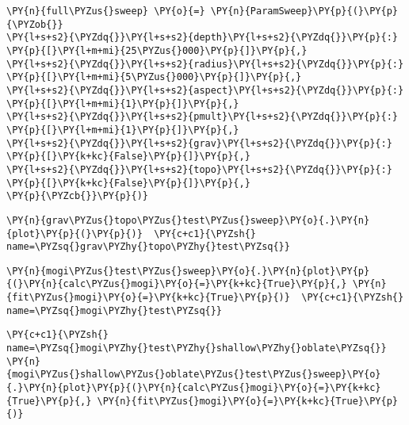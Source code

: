 \begin{tcolorbox}[breakable, size=fbox, boxrule=1pt, pad at break*=1mm,colback=cellbackground, colframe=cellborder]
\begin{Verbatim}[commandchars=\\\{\}]
\PY{n}{full\PYZus{}sweep} \PY{o}{=} \PY{n}{ParamSweep}\PY{p}{(}\PY{p}{\PYZob{}}
\PY{l+s+s2}{\PYZdq{}}\PY{l+s+s2}{depth}\PY{l+s+s2}{\PYZdq{}}\PY{p}{:} \PY{p}{[}\PY{l+m+mi}{25\PYZus{}000}\PY{p}{]}\PY{p}{,}
\PY{l+s+s2}{\PYZdq{}}\PY{l+s+s2}{radius}\PY{l+s+s2}{\PYZdq{}}\PY{p}{:} \PY{p}{[}\PY{l+m+mi}{5\PYZus{}000}\PY{p}{]}\PY{p}{,}
\PY{l+s+s2}{\PYZdq{}}\PY{l+s+s2}{aspect}\PY{l+s+s2}{\PYZdq{}}\PY{p}{:} \PY{p}{[}\PY{l+m+mi}{1}\PY{p}{]}\PY{p}{,}
\PY{l+s+s2}{\PYZdq{}}\PY{l+s+s2}{pmult}\PY{l+s+s2}{\PYZdq{}}\PY{p}{:} \PY{p}{[}\PY{l+m+mi}{1}\PY{p}{]}\PY{p}{,}
\PY{l+s+s2}{\PYZdq{}}\PY{l+s+s2}{grav}\PY{l+s+s2}{\PYZdq{}}\PY{p}{:} \PY{p}{[}\PY{k+kc}{False}\PY{p}{]}\PY{p}{,}
\PY{l+s+s2}{\PYZdq{}}\PY{l+s+s2}{topo}\PY{l+s+s2}{\PYZdq{}}\PY{p}{:} \PY{p}{[}\PY{k+kc}{False}\PY{p}{]}\PY{p}{,}
\PY{p}{\PYZcb{}}\PY{p}{)}
\end{Verbatim}
\end{tcolorbox}

\begin{tcolorbox}[breakable, size=fbox, boxrule=1pt, pad at break*=1mm,colback=cellbackground, colframe=cellborder]
\begin{Verbatim}[commandchars=\\\{\}]
\PY{n}{grav\PYZus{}topo\PYZus{}test\PYZus{}sweep}\PY{o}{.}\PY{n}{plot}\PY{p}{(}\PY{p}{)}  \PY{c+c1}{\PYZsh{} name=\PYZsq{}grav\PYZhy{}topo\PYZhy{}test\PYZsq{}}
\end{Verbatim}
\end{tcolorbox}

\begin{tcolorbox}[breakable, size=fbox, boxrule=1pt, pad at break*=1mm,colback=cellbackground, colframe=cellborder]
\begin{Verbatim}[commandchars=\\\{\}]
\PY{n}{mogi\PYZus{}test\PYZus{}sweep}\PY{o}{.}\PY{n}{plot}\PY{p}{(}\PY{n}{calc\PYZus{}mogi}\PY{o}{=}\PY{k+kc}{True}\PY{p}{,} \PY{n}{fit\PYZus{}mogi}\PY{o}{=}\PY{k+kc}{True}\PY{p}{)}  \PY{c+c1}{\PYZsh{} name=\PYZsq{}mogi\PYZhy{}test\PYZsq{}}
\end{Verbatim}
\end{tcolorbox}

\begin{tcolorbox}[breakable, size=fbox, boxrule=1pt, pad at break*=1mm,colback=cellbackground, colframe=cellborder]
\begin{Verbatim}[commandchars=\\\{\}]
\PY{c+c1}{\PYZsh{} name=\PYZsq{}mogi\PYZhy{}test\PYZhy{}shallow\PYZhy{}oblate\PYZsq{}}
\PY{n}{mogi\PYZus{}shallow\PYZus{}oblate\PYZus{}test\PYZus{}sweep}\PY{o}{.}\PY{n}{plot}\PY{p}{(}\PY{n}{calc\PYZus{}mogi}\PY{o}{=}\PY{k+kc}{True}\PY{p}{,} \PY{n}{fit\PYZus{}mogi}\PY{o}{=}\PY{k+kc}{True}\PY{p}{)}
\end{Verbatim}
\end{tcolorbox}


